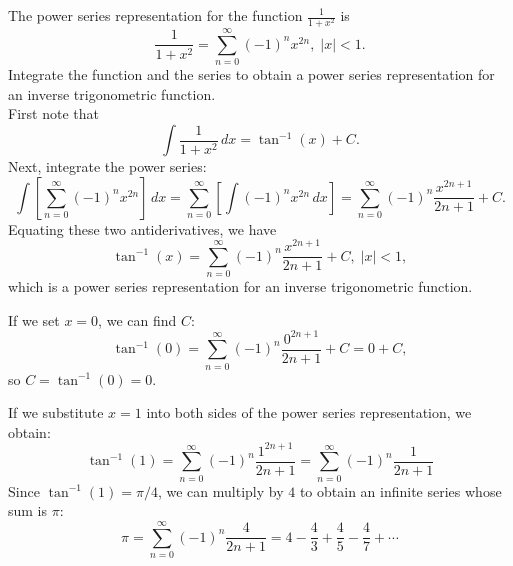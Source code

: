\documentclass{ximera}
\begin{document}
\begin{example}[example 3]
The power series representation for the function $\frac{1}{1+x^2}$ is 
\[
\frac{1}{1+x^2} = \sum_{n=0}^\infty (-1)^n x^{2n}, \; |x| < 1.
\]
Integrate the function and the series to obtain a power series representation for an inverse trigonometric function.\\
First note that
\[
\int \frac{1}{1+x^2} \, dx = \tan^{-1}(x) + C.
\]
Next, integrate the power series:
\[
\int \left[\sum_{n=0}^\infty (-1)^n x^{2n} \right] \, dx =  \sum_{n=0}^\infty \left[ \int(-1)^n x^{2n} \, dx \right] = \sum_{n=0}^\infty  (-1)^n \frac{x^{2n+1}}{2n+1} +C.
\]
Equating these two antiderivatives, we have
\[
\tan^{-1}(x) = \sum_{n=0}^\infty  (-1)^n \frac{x^{2n+1}}{2n+1} +C, \; |x| < 1,
\]
which is a power series representation for an inverse trigonometric function.

\begin{remark}[Remark 1]
If we set $x = 0$, we can find $C$:
\[
\tan^{-1}(0) = \sum_{n=0}^\infty  (-1)^n \frac{0^{2n+1}}{2n+1} +C = 0 + C,
\]
so $C = \tan^{-1}(0) = 0$.
\end{remark}

\begin{remark}[Remark 2]
If we substitute $x = 1$ into both sides of the power series representation, we obtain:
\[
\tan^{-1}(1) = \sum_{n=0}^\infty  (-1)^n \frac{1^{2n+1}}{2n+1} = \sum_{n=0}^\infty  (-1)^n \frac{1}{2n+1} 
\]
Since $\tan^{-1}(1) = \pi/4$, we can multiply by $4$ to obtain an infinite series whose sum is $\pi$:
\[
\pi = \sum_{n=0}^\infty  (-1)^n \frac{4}{2n+1} = 4 - \frac43 + \frac45 - \frac47 + \cdots
\]
\end{remark}




\end{example}
\end{document}
